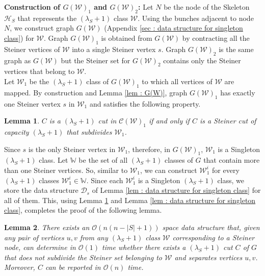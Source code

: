 \documentclass[letterpaper,11pt]{article}
\newtheorem{lemma}{Lemma}[]
\begin{document}
\noindent
\textbf{Construction of $G({\mathcal W})_1$ and $G({\mathcal W})_2$:} Let $N$ be the node of the Skeleton ${\mathcal H}_S$ that represents the $(\lambda_S+1)$ class ${\mathcal W}$. Using the bunches adjacent to node $N$, we construct graph $G({\mathcal W})$ (Appendix \ref{sec : data structure for singleton class}) for ${\mathcal W}$. Graph $G({\mathcal W})_1$ is obtained from $G({\mathcal W})$ by contracting all the Steiner vertices of ${\mathcal W}$ into a single Steiner vertex $s$. Graph $G({\mathcal W})_2$ is the same graph as $G({\mathcal W})$ but the Steiner set for $G({\mathcal W})_2$ contains only the Steiner vertices that belong to ${\mathcal W}$. \\

\noindent
Let ${\mathcal W}_1$ be the $(\lambda_S+1)$ class of $G({\mathcal W})_1$ to which all vertices of ${\mathcal W}$ are mapped. By construction and Lemma \ref{lem : G(W)}, graph $G({\mathcal W})_1$ has exactly one Steiner vertex $s$ in ${\mathcal W}_1$ and satisfies the following property.
\begin{lemma} \label{lem : all cuts in gw1}
    $C$ is a $(\lambda_S+1)$ cut in ${\mathcal C}({\mathcal W})_1$ if and only if $C$ is a  Steiner cut of capacity $(\lambda_S+1)$ that subdivides ${\mathcal W}_1$.     
\end{lemma}
Since $s$ is the only Steiner vertex in ${\mathcal W}_1$, therefore, in $G({\mathcal W})_1$, ${\mathcal W}_1$ is a Singleton $(\lambda_S+1)$ class. Let ${\mathbb W}$ be the set of all  $(\lambda_S+1)$ classes of $G$ that contain more than one Steiner vertices. So, similar to ${\mathcal W}_1$, we can construct ${\mathcal W}_1^i$ for every $(\lambda_S+1)$ classes ${\mathcal W}_1^i\in {\mathbb W}$. Since each ${\mathcal W}_1^i$ is a Singleton $(\lambda_S+1)$ class, we store the data structure ${\mathcal D}_s$ of Lemma \ref{lem : data structure for singleton class} for all of them. This, using Lemma \ref{lem : all cuts in gw1} and Lemma \ref{lem : data structure for singleton class}, completes the proof of the following lemma. \begin{lemma} \label{lem : data structure for G1}
    There exists an ${\mathcal O}(n(n-|S|+1))$ space data structure that, given any pair of vertices $u,v$ from any $(\lambda_S+1)$ class ${\mathcal W}$ corresponding to a Steiner node, can determine in ${\mathcal O}(1)$ time whether there exists a $(\lambda_S+1)$ cut $C$ of $G$ that does not subdivide the Steiner set belonging to ${\mathcal W}$ and  separates vertices $u,v$. Moreover, $C$ can be reported in ${\mathcal O}(n)$ time. 
\end{lemma} 
\end{document}
